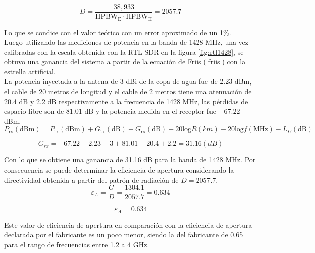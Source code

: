 \begin{equation}
    D = \frac{38,933}{\text{HPBW}_{\text{E}}\cdot \text{HPBW}_{\text{H}}} = 2057.7
\end{equation}

Lo que se condice con el valor teórico con un error aproximado de un 1\%.\\

Luego utilizando las mediciones de potencia en la banda de 1428 MHz, una vez calibradas con la escala obtenida con la RTL-SDR en la figura \ref{fig:rtl1428}, se obtuvo una ganancia del sistema a partir de la ecuación de Friis (\ref{friis}) con la estrella artificial.\\

La potencia inyectada a la antena de 3 dBi de la copa de agua fue de 2.23 dBm, el cable de 20 metros de longitud y el cable de 2 metros tiene una atenuación de 20.4 dB y 2.2 dB respectivamente a la frecuencia de 1428 MHz, las pérdidas de espacio libre son de 81.01 dB y la potencia medida en el receptor fue $-67.22$ dBm.\\

\begin{equation}
    P_{\text{rx}}(\text{dBm}) = P_{\text{tx}}(\text{dBm}) + G_{\text{tx}}(\text{dB}) + G_{\text{rx}}(\text{dB}) - 20\text{log}{R}(\text{}km) - 20\text{log}{f}(\text{MHz}) - L_{\Omega}(\text{dB})
\end{equation}

\begin{equation}
    G_{rx} = -67.22 -2.23 - 3 + 81.01 + 20.4 + 2.2 = 31.16 (dB)
\end{equation}

Con lo que se obtiene una ganancia de 31.16 dB para la banda de 1428 MHz. Por consecuencia se puede determinar la eficiencia de apertura considerando la directividad obtenida a partir del patrón de radiación de $D=2057.7$.\\

\begin{equation}
    \varepsilon_{A} = \frac{G}{D} = \frac{1304.1}{2057.7} = 0.634
\end{equation}

\begin{equation}
    \varepsilon_{A} = 0.634
\end{equation}

Este valor de eficiencia de apertura en comparación con la eficiencia de apertura declarada por el fabricante es un poco menor, siendo la del fabricante de 0.65 para el rango de frecuencias entre 1.2 a 4 GHz.\\

